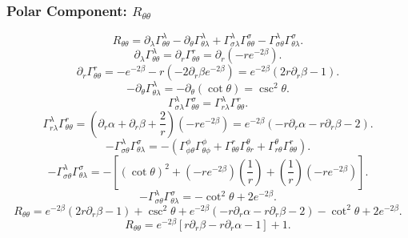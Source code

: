 \documentclass[11pt, a4paper]{report}
\begin{document}
\subsubsection{Polar Component: $R_{\theta\theta}$}
\begin{equation}
R_{\theta\theta} = \partial_\lambda \Gamma^\lambda_{\theta\theta} - \partial_\theta \Gamma^\lambda_{\theta\lambda} + \Gamma^\lambda_{\sigma\lambda} \Gamma^\sigma_{\theta\theta} - \Gamma^\lambda_{\sigma\theta} \Gamma^\sigma_{\theta\lambda}.
\end{equation}
\begin{equation}
\partial_\lambda \Gamma^\lambda_{\theta\theta} = \partial_r \Gamma^r_{\theta\theta} = \partial_r \left( -re^{-2\beta} \right).
\end{equation}
\begin{equation}
\partial_r \Gamma^r_{\theta\theta} = -e^{-2\beta} - r \left( -2\partial_r\beta e^{-2\beta} \right) = e^{-2\beta} \left( 2r\partial_r\beta - 1 \right).
\end{equation}
\begin{equation}
-\partial_\theta \Gamma^\lambda_{\theta\lambda} = -\partial_\theta (\cot\theta) = \csc^2\theta.
\end{equation}
\begin{equation}
\Gamma^\lambda_{\sigma\lambda} \Gamma^\sigma_{\theta\theta} = \Gamma^\lambda_{r\lambda} \Gamma^r_{\theta\theta}.
\end{equation}
\begin{equation}
\Gamma^\lambda_{r\lambda} \Gamma^r_{\theta\theta} = \left( \partial_r\alpha + \partial_r\beta + \frac{2}{r} \right) \left( -re^{-2\beta} \right) = e^{-2\beta} \left( -r\partial_r\alpha - r\partial_r\beta - 2 \right).
\end{equation}
\begin{equation}
-\Gamma^\lambda_{\sigma\theta} \Gamma^\sigma_{\theta\lambda} = -\left( \Gamma^\phi_{\phi\theta} \Gamma^\phi_{\theta\phi} + \Gamma^r_{\theta\theta} \Gamma^\theta_{\theta r} + \Gamma^\theta_{r\theta} \Gamma^r_{\theta\theta} \right).
\end{equation}
\begin{equation}
-\Gamma^\lambda_{\sigma\theta} \Gamma^\sigma_{\theta\lambda} = -\left[ (\cot\theta)^2 + \left( -re^{-2\beta} \right) \left(\frac{1}{r}\right) + \left(\frac{1}{r}\right) \left( -re^{-2\beta} \right) \right].
\end{equation}
\begin{equation}
-\Gamma^\lambda_{\sigma\theta} \Gamma^\sigma_{\theta\lambda} = -\cot^2\theta + 2e^{-2\beta}.
\end{equation}
\begin{equation}
R_{\theta\theta} = e^{-2\beta} \left( 2r\partial_r\beta - 1 \right) + \csc^2\theta + e^{-2\beta} \left( -r\partial_r\alpha - r\partial_r\beta - 2 \right) - \cot^2\theta + 2e^{-2\beta}.
\end{equation}
\begin{equation}
R_{\theta\theta} = e^{-2\beta} \left[ r\partial_r\beta - r\partial_r\alpha - 1 \right] + 1.
\end{equation}
\end{document}
